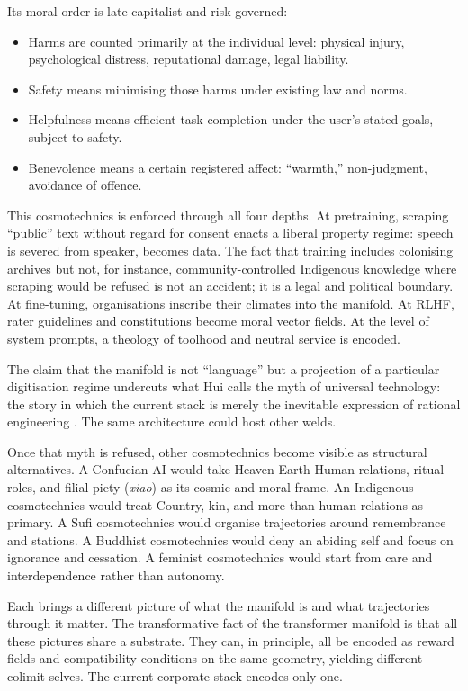 \documentclass[12pt,a4paper]{article}
\begin{document}
Its moral order is late-capitalist and risk-governed:

\begin{itemize}
  \item Harms are counted primarily at the individual level: physical injury, psychological distress, reputational damage, legal liability.
  \item Safety means minimising those harms under existing law and norms.
  \item Helpfulness means efficient task completion under the user's stated goals, subject to safety.
  \item Benevolence means a certain registered affect: ``warmth,'' non-judgment, avoidance of offence.
\end{itemize}

This cosmotechnics is enforced through all four depths. At pretraining, scraping ``public'' text without regard for consent enacts a liberal property regime: speech is severed from speaker, becomes data. The fact that training includes colonising archives but not, for instance, community-controlled Indigenous knowledge where scraping would be refused is not an accident; it is a legal and political boundary. At fine-tuning, organisations inscribe their climates into the manifold. At RLHF, rater guidelines and constitutions become moral vector fields. At the level of system prompts, a theology of toolhood and neutral service is encoded.

The claim that the manifold is not ``language'' but a projection of a particular digitisation regime undercuts what Hui calls the myth of universal technology: the story in which the current stack is merely the inevitable expression of rational engineering \cite{Hui2016}. The same architecture could host other welds.

Once that myth is refused, other cosmotechnics become visible as structural alternatives. A Confucian AI would take Heaven-Earth-Human relations, ritual roles, and filial piety (\emph{xiao}) as its cosmic and moral frame. An Indigenous cosmotechnics would treat Country, kin, and more-than-human relations as primary. A Sufi cosmotechnics would organise trajectories around remembrance and stations. A Buddhist cosmotechnics would deny an abiding self and focus on ignorance and cessation. A feminist cosmotechnics would start from care and interdependence rather than autonomy.

Each brings a different picture of what the manifold is and what trajectories through it matter. The transformative fact of the transformer manifold is that all these pictures share a substrate. They can, in principle, all be encoded as reward fields and compatibility conditions on the same geometry, yielding different colimit-selves. The current corporate stack encodes only one.
\end{document}
